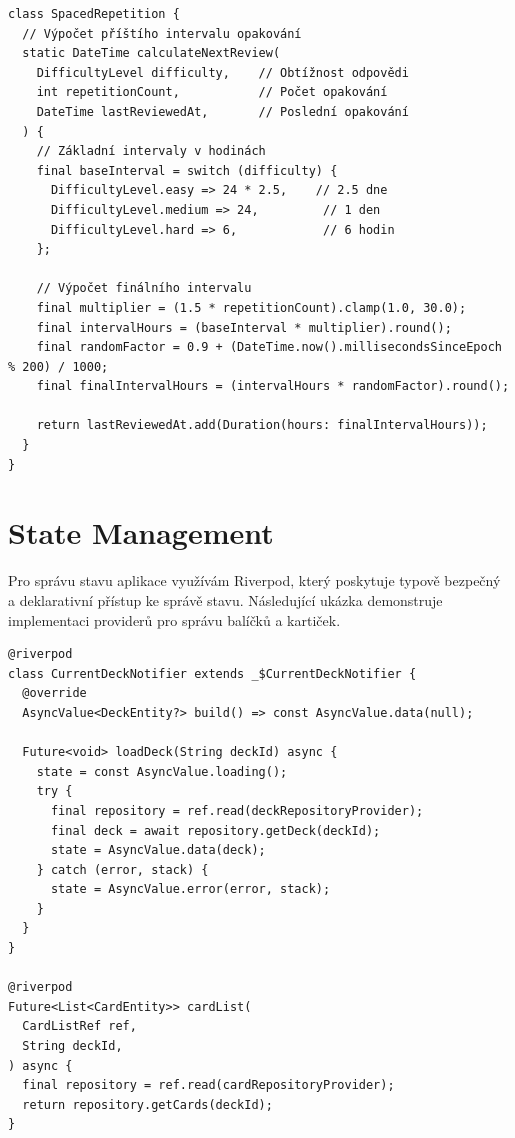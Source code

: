 \documentclass[12pt, a4paper, twoside, openright]{report}
\begin{document}
	\begin{lstlisting}[style=Python, caption=Implementace algoritmu Spaced Repetition]
class SpacedRepetition {
  // Výpočet příštího intervalu opakování
  static DateTime calculateNextReview(
    DifficultyLevel difficulty,    // Obtížnost odpovědi
    int repetitionCount,           // Počet opakování
    DateTime lastReviewedAt,       // Poslední opakování
  ) {
    // Základní intervaly v hodinách
    final baseInterval = switch (difficulty) {
      DifficultyLevel.easy => 24 * 2.5,    // 2.5 dne
      DifficultyLevel.medium => 24,         // 1 den
      DifficultyLevel.hard => 6,            // 6 hodin
    };

    // Výpočet finálního intervalu
    final multiplier = (1.5 * repetitionCount).clamp(1.0, 30.0);
    final intervalHours = (baseInterval * multiplier).round();
    final randomFactor = 0.9 + (DateTime.now().millisecondsSinceEpoch % 200) / 1000;
    final finalIntervalHours = (intervalHours * randomFactor).round();

    return lastReviewedAt.add(Duration(hours: finalIntervalHours));
  }
}
	\end{lstlisting}

	\section{State Management}
	Pro správu stavu aplikace využívám Riverpod, který poskytuje typově bezpečný a deklarativní přístup ke správě stavu. Následující ukázka demonstruje implementaci providerů pro správu balíčků a kartiček.

	\begin{lstlisting}[style=Python, caption=Implementace Riverpod providerů]
@riverpod
class CurrentDeckNotifier extends _$CurrentDeckNotifier {
  @override
  AsyncValue<DeckEntity?> build() => const AsyncValue.data(null);

  Future<void> loadDeck(String deckId) async {
    state = const AsyncValue.loading();
    try {
      final repository = ref.read(deckRepositoryProvider);
      final deck = await repository.getDeck(deckId);
      state = AsyncValue.data(deck);
    } catch (error, stack) {
      state = AsyncValue.error(error, stack);
    }
  }
}

@riverpod
Future<List<CardEntity>> cardList(
  CardListRef ref,
  String deckId,
) async {
  final repository = ref.read(cardRepositoryProvider);
  return repository.getCards(deckId);
}
	\end{lstlisting}
\end{document}

